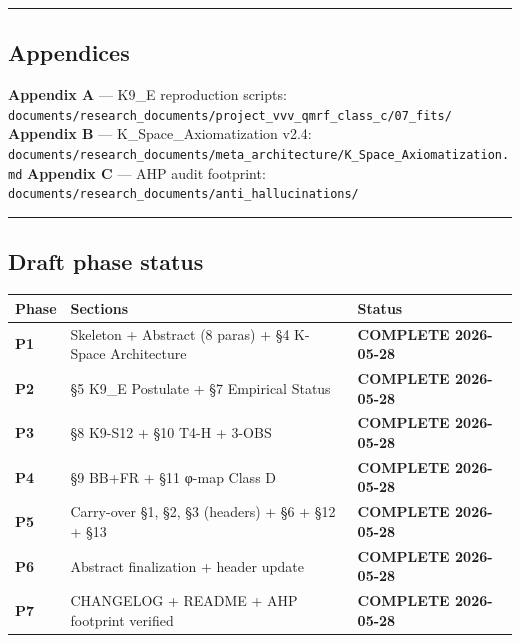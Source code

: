 \documentclass[
  11pt,
]{article}
\newcounter{none} %
\begin{document}
\begin{center}\rule{0.5\linewidth}{0.5pt}\end{center}

\subsection{Appendices}\label{appendices}

\textbf{Appendix A} --- K9\_E reproduction scripts:
\texttt{documents/research\_documents/project\_vvv\_qmrf\_class\_c/07\_fits/}
\textbf{Appendix B} --- K\_Space\_Axiomatization v2.4:
\texttt{documents/research\_documents/meta\_architecture/K\_Space\_Axiomatization.md}
\textbf{Appendix C} --- AHP audit footprint:
\texttt{documents/research\_documents/anti\_hallucinations/}

\begin{center}\rule{0.5\linewidth}{0.5pt}\end{center}

\subsection{Draft phase status}\label{draft-phase-status}

{\def\LTcaptype{none} %
\begin{longtable}[]{@{}
  >{\raggedright\arraybackslash}p{}
  >{\raggedright\arraybackslash}p{}
  >{\raggedright\arraybackslash}p{}@{}}
\toprule\noalign{}
\begin{minipage}[b]{\linewidth}\raggedright
Phase
\end{minipage} & \begin{minipage}[b]{\linewidth}\raggedright
Sections
\end{minipage} & \begin{minipage}[b]{\linewidth}\raggedright
Status
\end{minipage} \\
\midrule\noalign{}
\endhead
\bottomrule\noalign{}
\endlastfoot
\textbf{P1} & Skeleton + Abstract (8 paras) + §4 K-Space Architecture &
\textbf{COMPLETE 2026-05-28} \\
\textbf{P2} & §5 K9\_E Postulate + §7 Empirical Status &
\textbf{COMPLETE 2026-05-28} \\
\textbf{P3} & §8 K9-S12 + §10 T4-H + 3-OBS & \textbf{COMPLETE
2026-05-28} \\
\textbf{P4} & §9 BB+FR + §11 φ-map Class D & \textbf{COMPLETE
2026-05-28} \\
\textbf{P5} & Carry-over §1, §2, §3 (headers) + §6 + §12 + §13 &
\textbf{COMPLETE 2026-05-28} \\
\textbf{P6} & Abstract finalization + header update & \textbf{COMPLETE
2026-05-28} \\
\textbf{P7} & CHANGELOG + README + AHP footprint verified &
\textbf{COMPLETE 2026-05-28} \\
\end{longtable}
}
\end{document}
